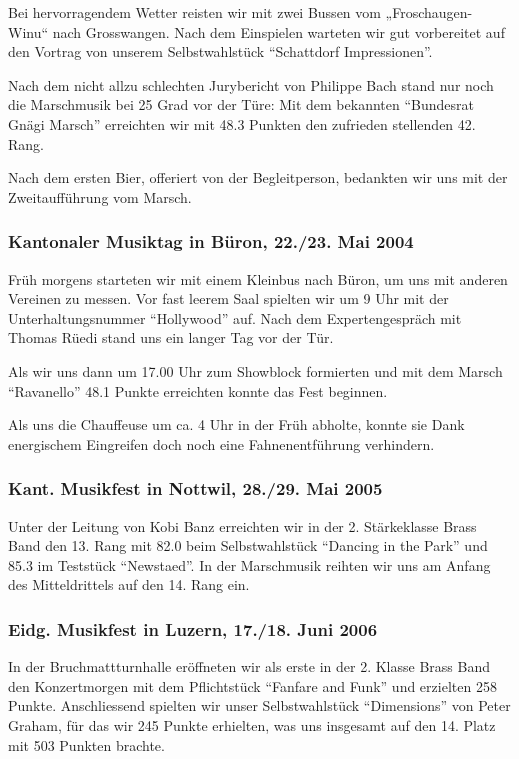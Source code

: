\begin{history}
    Bei hervorragendem Wetter reisten wir mit zwei Bussen vom „Froschaugen-
    Winu“ nach Grosswangen. Nach dem Einspielen warteten wir gut vorbereitet auf
    den Vortrag von unserem Selbstwahlstück \enquote{Schattdorf Impressionen}.

    Nach dem nicht allzu schlechten Jurybericht von Philippe Bach stand nur noch
    die Marschmusik bei 25 Grad vor der Türe: Mit dem bekannten
    \enquote{Bundesrat Gnägi Marsch} erreichten wir mit 48.3 Punkten den
    zufrieden stellenden 42. Rang.

    Nach dem ersten Bier, offeriert von der Begleitperson, bedankten wir uns mit
    der Zweitaufführung vom Marsch.


    \subsubsection*{Kantonaler Musiktag in Büron, 22./23. Mai 2004}

    Früh morgens starteten wir mit einem Kleinbus nach Büron, um uns mit anderen
    Vereinen zu messen. Vor fast leerem Saal spielten wir um 9 Uhr mit der
    Unterhaltungsnummer \enquote{Hollywood} auf. Nach dem Expertengespräch mit
    Thomas Rüedi stand uns ein langer Tag vor der Tür.

    Als wir uns dann um 17.00 Uhr zum Showblock formierten und mit dem Marsch
    \enquote{Ravanello} 48.1 Punkte erreichten konnte das Fest beginnen.

    Als uns die Chauffeuse um ca. 4 Uhr in der Früh abholte, konnte sie Dank
    energischem Eingreifen doch noch eine Fahnenentführung verhindern.


    \subsubsection*{Kant. Musikfest in Nottwil, 28./29. Mai 2005}

    Unter der Leitung von Kobi Banz erreichten wir in der 2. Stärkeklasse Brass
    Band den 13. Rang mit 82.0 beim Selbstwahlstück \enquote{Dancing in the
        Park} und 85.3 im Teststück \enquote{Newstaed}. In der Marschmusik reihten
    wir uns am Anfang des Mitteldrittels auf den 14. Rang ein.


    \subsubsection*{Eidg. Musikfest in Luzern, 17./18. Juni 2006}

    In der Bruchmattturnhalle eröffneten wir als erste in der 2. Klasse Brass
    Band den Konzertmorgen mit dem Pflichtstück \enquote{Fanfare and Funk} und
    erzielten 258 Punkte. Anschliessend spielten wir unser Selbstwahlstück
    \enquote{Dimensions} von Peter Graham, für das wir 245 Punkte erhielten, was
    uns insgesamt auf den 14. Platz mit 503 Punkten brachte.


\end{history}
